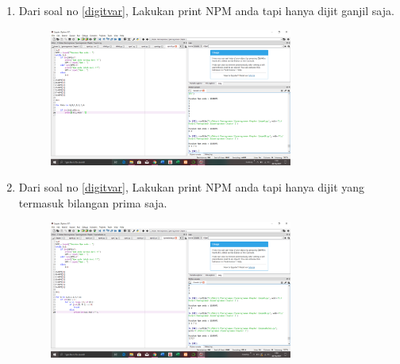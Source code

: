 \documentclass{article}
\begin{document}
\begin{enumerate}
\item
Dari soal no \ref{digitvar}, Lakukan print NPM anda tapi hanya dijit ganjil saja.
\begin{figure}[h]
\centerline{\includegraphics[width=8cm]{figures/npm10.png}}
\end{figure}


\item 
Dari soal no \ref{digitvar}, Lakukan print NPM anda tapi hanya dijit yang termasuk bilangan prima saja.
\begin{figure}[h]
\centerline{\includegraphics[width=8cm]{figures/npmsebelas.png}}
\end{figure}


\end{enumerate}
\end{document}
